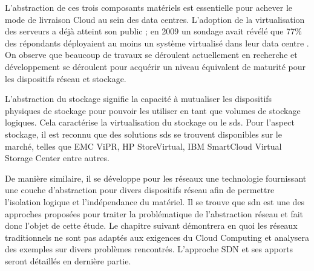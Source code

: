 L'abstraction de ces trois composants matériels est essentielle pour achever le mode de livraison Cloud au sein des data centres. L'adoption de la virtualisation des serveurs a déjà atteint son public ; en 2009 un sondage avait révélé que 77\% des répondants déployaient au moins un système virtualisé dans leur data centre \cite{x86ServersVirtualization}. On observe que beaucoup de travaux se déroulent actuellement en recherche et développement se déroulent pour acquérir un niveau équivalent de maturité pour les dispositifs réseau et stockage. 

L'abstraction du stockage signifie la capacité à mutualiser les dispositifs physiques de stockage pour pouvoir les utiliser en tant que volumes de stockage logiques. Cela caractérise la virtualisation du stockage ou le \gls{sds}. Pour l'aspect stockage, il est reconnu que des solutions \gls{sds} se trouvent disponibles sur le marché, telles que EMC ViPR, HP StoreVirtual, IBM SmartCloud Virtual Storage Center entre autres.

De manière similaire, il se développe pour les réseaux une technologie fournissant une couche d'abstraction pour divers dispositifs réseau afin de permettre l'isolation logique et l'indépendance du matériel. Il se trouve que \gls{sdn} est une des approches proposées pour traiter la problématique de l'abstraction réseau et fait donc l'objet de cette étude. Le chapitre suivant démontrera en quoi les réseaux traditionnels ne sont pas adaptés aux exigences du Cloud Computing et analysera des exemples sur divers problèmes rencontrés. L'approche SDN et ses apports seront détaillés en dernière partie.
\cite{ibmPlanningVirtCCchap1}  \cite{cloudReadyJuniperReferenceDef} \cite{journeySDDC} \cite{ciscoCCDCStrategyArchiSolutions}

